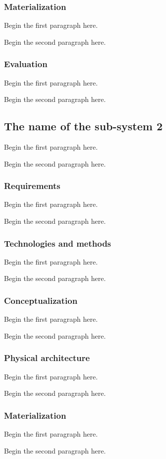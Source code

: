 \documentclass{article}
\begin{document}
\subsubsection{Materialization}
Begin the first paragraph here.
\par
Begin the second paragraph here.

\subsubsection{Evaluation}
Begin the first paragraph here.
\par
Begin the second paragraph here.


\subsection{The name of the sub-system 2}
Begin the first paragraph here.
\par
Begin the second paragraph here.

\subsubsection{Requirements}
Begin the first paragraph here.
\par
Begin the second paragraph here.

\subsubsection{Technologies and methods}
Begin the first paragraph here.
\par
Begin the second paragraph here.

\subsubsection{Conceptualization}
Begin the first paragraph here.
\par
Begin the second paragraph here.

\subsubsection{Physical architecture}
Begin the first paragraph here.
\par
Begin the second paragraph here.

\subsubsection{Materialization}
Begin the first paragraph here.
\par
Begin the second paragraph here.
\end{document}
